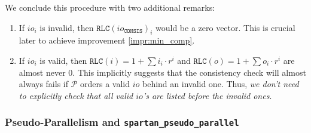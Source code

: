 \documentclass{article}
\newcommand{\code}{\texttt}
\renewcommand{\P}{\mathcal{P}}
\newcommand{\RLC}{\mathtt{RLC}}
\newcommand{\ioc}{io_{\mathtt{CONSIS}}}
\begin{document}
We conclude this procedure with two additional remarks:
\begin{enumerate}
    \item If $io_i$ is invalid, then $\RLC(\ioc)_i$ would be a zero vector. This is crucial later to achieve improvement \ref{impr:min_comp}.
    \item If $io_i$ is valid, then $\RLC(i) = 1 + \sum i_i\cdot r^i$ and $\RLC(o) = 1 + \sum o_i\cdot r^i$ are almost never 0. This implicitly suggests that the consistency check will almost always fails if $\P$ orders a valid $io$ behind an invalid one. Thus, \emph{we don't need to explicitly check that all valid $io$'s are listed before the invalid ones}.
\end{enumerate}

\subsubsection{Pseudo-Parallelism and \code{spartan\_pseudo\_parallel}}
\end{document}
